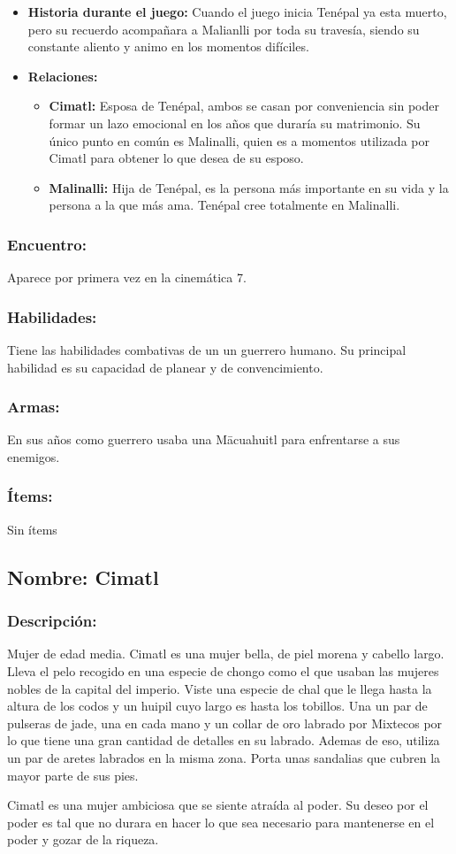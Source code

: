 \documentclass[11pt,letterpaper]{article}
\begin{document}
\begin{itemize}
	\item \textbf{Historia durante el juego:}
	Cuando el juego inicia Tenépal ya esta muerto, pero su recuerdo acompañara a Malianlli por toda su travesía, siendo su constante aliento y animo en los momentos difíciles.
	\item \textbf{Relaciones:}
	\begin{itemize}
		\item \textbf{Cimatl:} Esposa de Tenépal, ambos se casan por conveniencia sin poder formar un lazo emocional en los años que duraría su matrimonio. Su único punto en común es Malinalli, quien es a momentos utilizada por Cimatl para obtener lo que desea de su esposo.
		\item \textbf{Malinalli:} Hija de Tenépal, es la persona más importante en su vida y la persona a la que más ama. Tenépal cree totalmente en Malinalli. 
	\end{itemize}                     
\end{itemize}

\subsubsection{Encuentro:}
Aparece por primera vez en la cinemática 7.
\subsubsection{Habilidades:}
Tiene las habilidades combativas de un un guerrero humano. Su principal habilidad es su capacidad de planear y de convencimiento.
\subsubsection{Armas:}
En sus años como guerrero usaba una Mācuahuitl para enfrentarse a sus enemigos.
\subsubsection{Ítems:}
Sin ítems


\subsection{Nombre: Cimatl}  
\subsubsection{Descripción:} 
Mujer de edad media. Cimatl es una mujer bella, de piel morena y cabello largo. Lleva el pelo recogido en una especie de chongo como el que usaban las mujeres nobles de la capital del imperio. Viste una especie de chal que le llega hasta la altura de los codos y un huipil cuyo largo es hasta los tobillos. Una un par de pulseras de jade, una en cada mano y un collar de oro labrado por Mixtecos por lo que tiene una gran cantidad de detalles en su labrado. Ademas de eso, utiliza un par de aretes labrados en la misma zona. Porta unas sandalias que cubren la mayor parte de sus pies.
\\
\par
Cimatl es una mujer ambiciosa que se siente atraída al poder. Su deseo por el poder es tal que no durara en hacer lo que sea necesario para mantenerse en el poder y gozar de la riqueza.        
\end{document}
